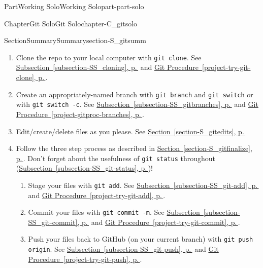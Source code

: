 \documentclass[twoside,10pt,]{book}
\newcommand{\xreffont}{\relax}
\newcommand{\mono}[1]{\texttt{#1}}
\begin{document}
\begin{partptx}{Part}{Working Solo}{}{Working Solo}{}{}{part-part-solo}
\begin{chapterptx}{Chapter}{Git Solo}{}{Git Solo}{}{}{chapter-C_gitsolo}
\begin{sectionptx}{Section}{Summary}{}{Summary}{}{}{section-S_gitsumm}
\begin{enumerate}
\item{}Clone the repo to your local computer with \mono{git clone}. See \hyperref[subsection-SS_cloning]{Subsection~{\xreffont\ref{subsection-SS_cloning}}, p.\,\pageref{subsection-SS_cloning}} and \hyperref[project-try-git-clone]{Git Procedure~{\xreffont\ref{project-try-git-clone}}, p.\,\pageref{project-try-git-clone}}.%
\item{}Create an appropriately-named branch with \mono{git branch} and \mono{git switch} or with \mono{git switch -c}. See \hyperref[subsection-SS_gitbranches]{Subsection~{\xreffont\ref{subsection-SS_gitbranches}}, p.\,\pageref{subsection-SS_gitbranches}} and \hyperref[project-gitproc-branches]{Git Procedure~{\xreffont\ref{project-gitproc-branches}}, p.\,\pageref{project-gitproc-branches}}.%
\item{}Edit\slash{}create\slash{}delete files as you please. See \hyperref[section-S_gitedits]{Section~{\xreffont\ref{section-S_gitedits}}, p.\,\pageref{section-S_gitedits}}%
\item{}Follow the three step process as described in \hyperref[section-S_gitfinalize]{Section~{\xreffont\ref{section-S_gitfinalize}}, p.\,\pageref{section-S_gitfinalize}}. Don't forget about the usefulness of \mono{git status} throughout (\hyperref[subsection-SS_git-status]{Subsection~{\xreffont\ref{subsection-SS_git-status}}, p.\,\pageref{subsection-SS_git-status}})!%
\begin{enumerate}
\item{}Stage your files with \mono{git add}. See \hyperref[subsection-SS_git-add]{Subsection~{\xreffont\ref{subsection-SS_git-add}}, p.\,\pageref{subsection-SS_git-add}} and \hyperref[project-try-git-add]{Git Procedure~{\xreffont\ref{project-try-git-add}}, p.\,\pageref{project-try-git-add}}.%
\item{}Commit your files with \mono{git commit -m}. See \hyperref[subsection-SS_git-commit]{Subsection~{\xreffont\ref{subsection-SS_git-commit}}, p.\,\pageref{subsection-SS_git-commit}} and \hyperref[project-try-git-commit]{Git Procedure~{\xreffont\ref{project-try-git-commit}}, p.\,\pageref{project-try-git-commit}}.%
\item{}Push your files back to GitHub (on your current branch) with \mono{git push origin}. See \hyperref[subsection-SS_git-push]{Subsection~{\xreffont\ref{subsection-SS_git-push}}, p.\,\pageref{subsection-SS_git-push}} and \hyperref[project-try-git-push]{Git Procedure~{\xreffont\ref{project-try-git-push}}, p.\,\pageref{project-try-git-push}}.%
\end{enumerate}

\end{enumerate}
\end{sectionptx}
\end{chapterptx}
\end{partptx}
\end{document}
